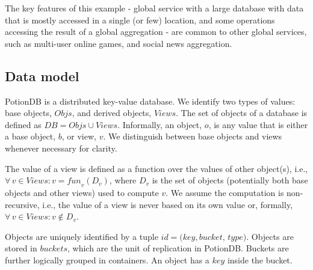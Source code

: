 \documentclass[sigplan,twocolumn,review,anonymous]{acmart}
\begin{document}
The key features of this example - global service with a large database with
data that is mostly accessed in a single (or few) location,  and some operations accessing the result
of a global aggregation - are common to other global services, such as multi-user online games, and
social news aggregation.



\subsection{Data model}
\label{subsec:datamodel}

PotionDB is a distributed key-value database.
We identify two types of values: base objects, $\mathit{Objs}$, and derived objects, $\mathit{Views}$.
The set of objects of a database is defined as $\mathit{DB} = \mathit{Objs} \cup \mathit{Views}$.
Informally, an object, $o$, is any value that is either a base object, $b$, or view, $v$.
We distinguish between base objects and views whenever necessary for clarity.

The value of a view is defined as a function over the values of other object(s), i.e., 
$\forall\, v \in \mathit{Views} : v = \mathit{fun}_v(D_v)$, 
where $D_v$ is the set of objects (potentially both base objects and other views) used to compute $v$.
We assume the computation is non-recursive, i.e., the value of a view is never based on its own value or, formally, 
$\forall\, v \in \mathit{Views} : v \notin D_v$.

Objects are uniquely identified by a tuple $\mathit{id} = \mathit{(key, bucket}$, $\mathit{type)}$.
Objects are stored in $\mathit{buckets}$, which are the unit of replication in PotionDB. 
Buckets are further logically grouped in containers. %
An object has a $\mathit{key}$ inside the bucket.
\end{document}
